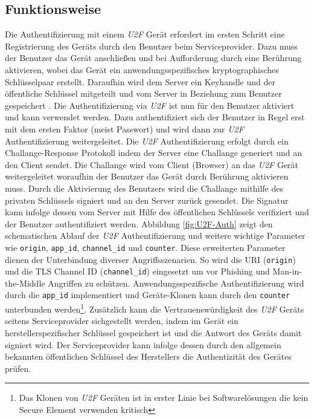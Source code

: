 \documentclass[11pt,a4paper,ngerman]{scrreprt}
\begin{document}
\subsection{Funktionsweise}
Die Authentifizierung mit einem \textit{U2F} Gerät erfordert im ersten Schritt eine Registrierung des Geräts durch den Benutzer beim Serviceprovider. Dazu muss der Benutzer das Gerät anschließen und bei Aufforderung durch eine Berührung aktivieren, wobei das Gerät ein anwendungsspezifisches kryptographisches Schlüsselpaar erstellt. Daraufhin wird dem Server ein Keyhandle und der öffentliche Schlüssel mitgeteilt und vom Server in Beziehung zum Benutzer gespeichert \cite{u2fv1}. Die Authentifizierung via \textit{U2F} ist nun für den Benutzer aktiviert und kann verwendet werden. Dazu authentifiziert sich der Benutzer in Regel erst mit dem ersten Faktor (meist Passwort) und wird dann zur \textit{U2F} Authentifizierung weitergeleitet. Die \textit{U2F} Authentifizierung erfolgt durch ein Challange-Response Protokoll indem der Server eine Challange generiert und an den Client sendet. Die Challange wird vom Client (Browser) an das \textit{U2F} Gerät weitergeleitet woraufhin der Benutzer das Gerät durch Berührung aktivieren muss. Durch die Aktivierung des Benutzers wird die Challange mithilfe des privaten Schlüssels signiert und an den Server zurück gesendet. Die Signatur kann infolge dessen vom Server mit Hilfe des öffentlichen Schlüssels verifiziert und der Benutzer authentifiziert werden. Abbildung \ref{fig:U2F-Auth} \cite{u2fTech} zeigt den schematischen Ablauf der \textit{U2F} Authentifizierung und weitere wichtige Parameter wie \texttt{origin}, \texttt{app\_id}, \texttt{channel\_id} und \texttt{counter}. Diese erweiterten Parameter dienen der Unterbindung diverser Angriffsszenarien. So wird die URI (\texttt{origin}) und die TLS Channel ID (\texttt{channel\_id}) eingesetzt um vor Phishing und Man-in-the-Middle Angriffen zu schützen. Anwendungsspezifische Authentifizierung wird durch die \texttt{app\_id} implementiert und Geräte-Klonen kann durch den \texttt{counter} unterbunden werden\footnote{Das Klonen von \textit{U2F} Geräten ist in erster Linie bei Softwarelösungen die kein Secure Element verwenden kritisch}. Zusätzlich kann die Vertrauenswürdigkeit des \textit{U2F} Geräts seitens Serviceprovider sichgestellt werden, indem im Gerät ein herstellerspezifischer Schlüssel gespeichert ist und die Antwort des Geräts damit signiert wird. Der Serviceprovider kann infolge dessen durch den allgemein bekannten öffentlichen Schlüssel des Herstellers die Authentizität des Gerätes prüfen.
\end{document}
